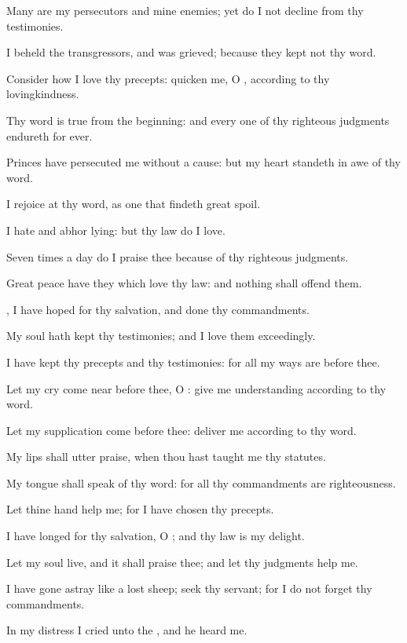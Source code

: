 \Verse Many are my persecutors and mine enemies; yet do I not decline from thy testimonies.

\Verse I beheld the transgressors, and was grieved; because they kept not thy word.

\Verse Consider how I love thy precepts: quicken me, O \LORD, according to thy lovingkindness.

\Verse Thy word is true from the beginning: and every one of thy righteous judgments endureth for ever.

\Verse Princes have persecuted me without a cause: but my heart standeth in awe of thy word.

\Verse I rejoice at thy word, as one that findeth great spoil.

\Verse I hate and abhor lying: but thy law do I love.

\Verse Seven times a day do I praise thee because of thy righteous judgments.

\Verse Great peace have they which love thy law: and nothing shall offend them.

\Verse \LORD, I have hoped for thy salvation, and done thy commandments.

\Verse My soul hath kept thy testimonies; and I love them exceedingly.

\Verse I have kept thy precepts and thy testimonies: for all my ways are before thee.

\Verse Let my cry come near before thee, O \LORD: give me understanding according to thy word.

\Verse Let my supplication come before thee: deliver me according to thy word.

\Verse My lips shall utter praise, when thou hast taught me thy statutes.

\Verse My tongue shall speak of thy word: for all thy commandments are righteousness.

\Verse Let thine hand help me; for I have chosen thy precepts.

\Verse I have longed for thy salvation, O \LORD; and thy law is my delight.

\Verse Let my soul live, and it shall praise thee; and let thy judgments help me.

\Verse I have gone astray like a lost sheep; seek thy servant; for I do not forget thy commandments.




\Chapter
\Verse In my distress I cried unto the \LORD, and he heard me.

